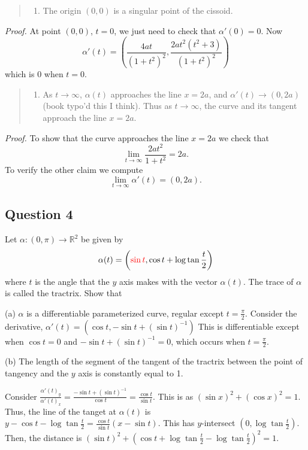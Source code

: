 \documentclass[12pt]{article}
\begin{document}
\begin{quote}
\begin{enumerate}
\def\labelenumi{\alph{enumi}.}
\setcounter{enumi}{1}
\item
  The origin \((0,0)\) is a singular point of the cissoid.
\end{enumerate}
\end{quote}

\emph{Proof.} At point \((0,0)\), \(t = 0\), we just need to check that
\(\alpha'(0) = 0\). Now
\[ \alpha'(t) = \left( \frac{4a t}{(1+t^2)^2}, \frac{2a t^2(t^2 + 3)}{(1+t^2)^2}  \right) \]
which is \(0\) when \(t = 0\).

\begin{quote}
\begin{enumerate}
\def\labelenumi{\alph{enumi}.}
\setcounter{enumi}{2}
\item
  As \(t\to\infty\), \(\alpha(t)\) approaches the line \(x = 2a\), and
  \(\alpha'(t) \to (0, 2a)\) (book typo'd this I think). Thus as
  \(t\to\infty\), the curve and its tangent approach the line
  \(x = 2a\).
\end{enumerate}
\end{quote}

\emph{Proof.} To show that the curve approaches the line \(x=2a\) we
check that \[ \lim_{t\to\infty} \frac{2at^2}{1+t^2} = 2a. \] To verify
the other claim we compute \[ \lim_{t\to\infty} \alpha'(t) = (0, 2a). \]


\subsection*{Question 4}

Let $\alpha : (0, \pi) \to \mathbb R^2$ be given by
$$\alpha(t) = \left ({\color{red}\sin t}, \cos t + \log \tan \frac t2\right )$$
where $t$ is the angle that the $y$ axis makes with the vector $\alpha(t)$. The trace of $\alpha$ is
called the tractrix. 
Show that

(a) $\alpha$ is a differentiable parameterized curve, regular except $t = \frac \pi2$.
Consider the derivative, $\alpha'(t) = \left (\cos t, -\sin t + (\sin t)^{-1}\right )$
This is differentiable except when $\cos t = 0$ and $-\sin t + (\sin t)^{-1} = 0$, 
which occurs when $t = \frac \pi2$.

(b) The length of the segment of the tangent of the tractrix 
between the point of tangency and the $y$ axis is constantly equal to 1.

Consider $\frac {\alpha'(t)_y}{\alpha'(t)_x} = \frac{-\sin t + (\sin t)^{-1}}{\cos t} = \frac {\cos t}{\sin t}.$ This is as $(\sin x)^2 + (\cos x)^2 = 1.$
Thus, the line of the tanget at $\alpha(t)$ is $y - \cos t - \log \tan \frac t2 = \frac{\cos t}{\sin t}(x - \sin t).$
This has $y$-intersect $(0,\log \tan \frac t2).$ Then, the distance is $(\sin t)^2 + (\cos t + \log \tan \frac t2 - \log \tan \frac t2)^2 = 1.$
\end{document}
